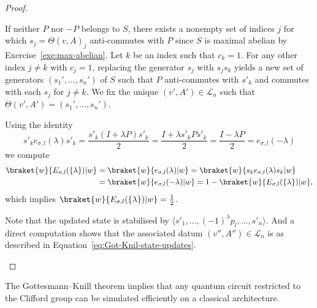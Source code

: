 \documentclass[a4paper, oneside, 12pt]{amsart}
\begin{document}
\begin{proof}
\begin{thmlist}
    If neither \(P\) nor \(-P\) belongs to \(S\), there exists a nonempty set of indices \(j\) for which \(s_{j}=\Theta(v,A)_j\) anti-commutes with \(P\) since \(S\) is maximal abelian by  Exercise~\ref{exe:max-abelian}.
    Let \(k\) be an index such that \(c_k = 1\).
    For any other index \(j \neq k\) with \(c_j = 1\), replacing the generator \(s_j\) with \(s_j s_k\) yields a new set of generators \((s_{1}', \dots , s_{n}')\) of \(S\) such that \(P\) anti-commutes with \(s'_{k}\) and commutes with each \(s_{j}\) for \(j\neq k\).
    We fix the unique \((v', A') \in \mathcal{L}_{n}\) such that \(\Theta(v', A') = (s_{1}', \dots , s_{n}')\).

    Using the identity
    \begin{equation*}
      s'_k e_{\sigma,l}(\lambda) s'_k
      = \frac{s'_k (I + \lambda P) s'_k}{2}
      = \frac{I + \lambda s'_{k} P s'_{k}}{2}
      = \frac{I - \lambda  P }{2}
      = e_{\sigma,l}(-\lambda)
    \end{equation*}
    we compute
    \begin{align*}
      \braket{w}{ E_{\sigma,l}(\{\lambda\}) | w}
      & = \braket{w}{e_{\sigma,l}(\lambda) | w}
        = \braket{w}{ s_k e_{\sigma,l}(\lambda) s_k | w} \\
      & = \braket{w}{ e_{\sigma,l}(-\lambda) | w}
        = 1 - \braket{w }{ E_{\sigma,l}(\{\lambda\}) | w},
    \end{align*}
    which implies \(\braket{w}{E_{\sigma,l}(\{\lambda\}) | w} = \tfrac{1}{2}\).

    Note that the updated state is stabilised by \(\langle s'_{1}, \dots , (-1)^{\lambda}p_{l}, \dots , s'_{n}\rangle\).
    And a direct computation shows that the associated datum \((v'', A'' ) \in \mathcal{L}_{n}\) is as described in Equation~\eqref{eq:Got-Knil-state-updates}. \qedhere
  \end{thmlist}
\end{proof}

The Gottesmann--Knill theorem implies that any quantum circuit restricted to the Clifford group can be simulated efficiently on a classical architecture.
\end{document}

